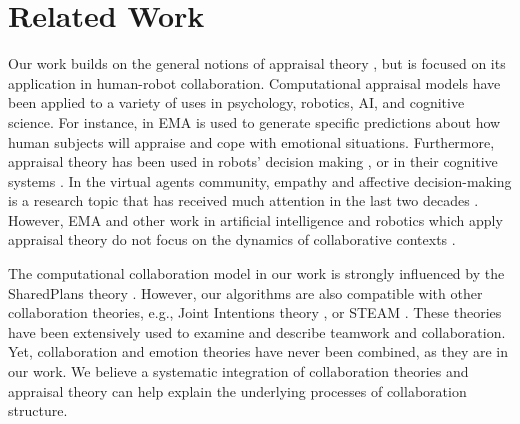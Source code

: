\documentclass{sig-alternate-05-2015}
\begin{document}

\section{Related Work}
Our work builds on the general notions of appraisal theory
\cite{gratch:domain-independent,marsella:computational,scherer:sequential-appraisal-process,scherer:appraisal-processes},
but is focused on its application in human-robot collaboration. Computational
appraisal models have been applied to a variety of uses in psychology, robotics,
AI, and cognitive science. For instance, in \cite{marsella:ema-process-model}
EMA is used to generate specific predictions about how human subjects will
appraise and cope with emotional situations. Furthermore, appraisal theory has
been used in robots' decision making \cite{castro:autonomous-robot-fear}, or in
their cognitive systems
\cite{hudlicka:emotinos-reasons,marinier:emotion-reinforcement}. In the virtual
agents community, empathy and affective decision-making is a research topic that
has received much attention in the last two decades
\cite{scott:modeling-empathy-agent,paiva:agent-care,pontier:women-robot-men,velasquez:emotions-motivations-agents}.
However, EMA and other work in artificial intelligence and robotics which apply
appraisal theory do not focus on the dynamics of collaborative contexts
\cite{adam:bdi-emotional-companion,kim:model-hri-appraisal,marsella:ema-process-model,rosenbloom:sigma-appraisal}.

The computational collaboration model in our work is strongly influenced by the
SharedPlans theory \cite{grosz:plans-discourse}. However, our algorithms are
also compatible with other collaboration theories, e.g., Joint Intentions theory
\cite{cohen:teamwork}, or STEAM \cite{tambe:flexible-teamwork}. These theories
have been extensively used to examine and describe teamwork and collaboration.
Yet, collaboration and emotion theories have never been combined, as they are in
our work. We believe a systematic integration of collaboration theories and
appraisal theory can help explain the underlying processes of collaboration
structure.
\end{document}
